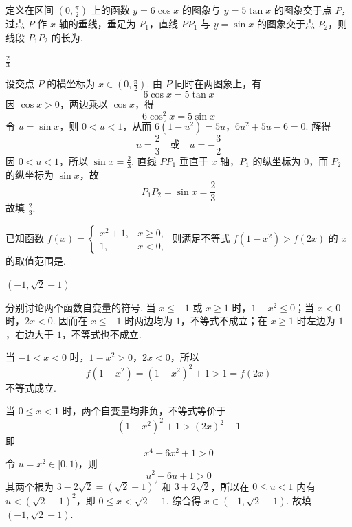 \begin{problem}
定义在区间 \(\left(0,\frac{\pi}{2}\right)\) 上的函数 \(y=6\cos x\) 的图象与 \(y=5\tan x\) 的图象交于点 \(P\)，过点 \(P\) 作 \(x\) 轴的垂线，垂足为 \(P_1\)，直线 \(PP_1\) 与 \(y=\sin x\) 的图象交于点 \(P_2\)，则线段 \(P_1P_2\) 的长为\fillinblank{}.
\end{problem}

\begin{answer}
\(\frac{2}{3}\)
\end{answer}

\begin{solution}
设交点 \(P\) 的横坐标为 \(x\in\left(0,\frac{\pi}{2}\right)\). 由 \(P\) 同时在两图象上，有
\[
6\cos x=5\tan x
\]
因 \(\cos x>0\)，两边乘以 \(\cos x\)，得
\[
6\cos^2x=5\sin x
\]
令 \(u=\sin x\)，则 \(0<u<1\)，从而
\(6(1-u^2)=5u\)，\(6u^2+5u-6=0\).
解得
\[
u=\frac{2}{3}\quad\text{或}\quad u=-\frac{3}{2}
\]
因 \(0<u<1\)，所以 \(\sin x=\frac{2}{3}\). 直线 \(PP_1\) 垂直于 \(x\) 轴，\(P_1\) 的纵坐标为 \(0\)，而 \(P_2\) 的纵坐标为 \(\sin x\)，故
\[
P_1P_2=\sin x=\frac{2}{3}
\]
故填 \(\frac{2}{3}\).
\end{solution}

\begin{problem}
已知函数 \(f(x)=\begin{cases}
x^2+1,&x\geqslant 0,\\
1,&x<0,
\end{cases}\) 则满足不等式 \(f(1-x^2)>f(2x)\) 的 \(x\) 的取值范围是\fillinblank{}.
\end{problem}

\begin{answer}
\((-1,\sqrt{2}-1)\)
\end{answer}

\begin{solution}
分别讨论两个函数自变量的符号. 当 \(x\leqslant-1\) 或 \(x\geqslant1\) 时，\(1-x^2\leqslant0\)；当 \(x<0\) 时，\(2x<0\). 因而在 \(x\leqslant-1\) 时两边均为 \(1\)，不等式不成立；在 \(x\geqslant1\) 时左边为 \(1\)，右边大于 \(1\)，不等式也不成立.

当 \(-1<x<0\) 时，\(1-x^2>0\)，\(2x<0\)，所以
\[
f(1-x^2)=(1-x^2)^2+1>1=f(2x)
\]
不等式成立.

当 \(0\leqslant x<1\) 时，两个自变量均非负，不等式等价于
\[
(1-x^2)^2+1>(2x)^2+1
\]
即
\[
x^4-6x^2+1>0
\]
令 \(u=x^2\in[0,1)\)，则
\[
u^2-6u+1>0
\]
其两个根为 \(3-2\sqrt2=(\sqrt2-1)^2\) 和 \(3+2\sqrt2\)，所以在 \(0\leqslant u<1\) 内有 \(u<(\sqrt2-1)^2\)，即 \(0\leqslant x<\sqrt2-1\). 综合得 \(x\in(-1,\sqrt2-1)\). 故填 \((-1,\sqrt2-1)\).
\end{solution}

